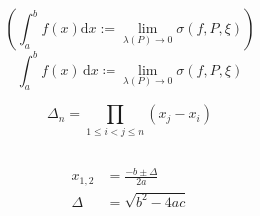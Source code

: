 \documentclass{article}
\begin{document}
\begin{equation}
	
\end{equation}

\begin{equation}
		
\end{equation}

\begin{equation}
	
\end{equation}

\begin{equation}
	\left( \int_a^bf(x)\mathrm{d}x:=\lim_{\lambda(P)\rightarrow 0}\sigma(f, P, \xi) \right)
\end{equation}
\begin{equation}
\int_a^b f(x) \,\mathrm{d}x \coloneqq \lim_{\lambda(P)\rightarrow 0}\sigma(f, P, \xi)
\end{equation}

\begin{equation}
	\Delta_{n} = \prod_{1 \leqslant i < j \leqslant n} \left( x_{j} - x_{i} \right)	
\end{equation}

\begin{equation}
		
\end{equation}

\begin{equation}
	\begin{aligned}
		x_{1,2}&=\frac{-b\pm\Delta}{2a}\\
		\Delta&=\sqrt{b^2-4ac}
	\end{aligned}
\end{equation}






\end{document}
